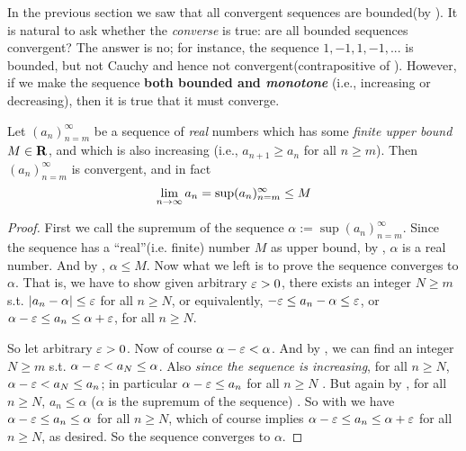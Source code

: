 \begin{note}
In the previous section we saw that all convergent sequences are bounded(by ).
It is natural to ask whether the \emph{converse} is true:
are all bounded sequences convergent?
The answer is no;
for instance, the sequence \(1, -1, 1, -1,...\) is bounded, but not Cauchy and hence not convergent(contrapositive of ).
However, if we make the sequence \textbf{both bounded and \emph{monotone}} (i.e., increasing or decreasing), then it is true that it must converge.
\end{note}

\begin{proposition}  \label{prop 6.3.8}
Let \((a_n)_{n = m}^{\infty}\) be a sequence of \emph{real} numbers which has some \emph{finite upper bound} \(M \in \mathbf{R}\), and which is also increasing (i.e., \(a_{n + 1} \ge a_n\) for all \(n \ge m\)).
Then \((a_n)_{n = m}^{\infty}\) is convergent, and in fact
\[
    \lim_{n \to \infty} a_n = \sup(a_n)_{n = m}^{\infty} \le M
\]
\end{proposition}

\begin{proof}
First we call the supremum of the sequence \(\alpha := \sup(a_n)_{n = m}^{\infty}\).
Since the sequence has a ``real''(i.e. finite) number \(M\) as upper bound, by , \(\alpha\) is a real number.
And by , \(\alpha \le M\).
Now what we left is to prove the sequence converges to \(\alpha\).
That is, we have to show given arbitrary \(\varepsilon > 0\), there exists an integer \(N \ge m\) s.t. \(\lvert a_n - \alpha\rvert \le \varepsilon\) for all \(n \ge N\), or equivalently, \(-\varepsilon \le a_n - \alpha \le \varepsilon\), or \(\alpha - \varepsilon \le a_n \le \alpha + \varepsilon\), for all \(n \ge N\).

So let arbitrary \(\varepsilon > 0\).
Now of course \(\alpha - \varepsilon < \alpha\).
And by , we can find an integer \(N \ge m\) s.t. \(\alpha - \varepsilon < a_N \le \alpha\).
Also \emph{since the sequence is increasing}, for all \(n \ge N\), \(\alpha - \varepsilon < a_N \le a_n\);
in particular \(\alpha - \varepsilon \le a_n\) for all \(n \ge N\) .
But again by , for all \(n \ge N\), \(a_n \le \alpha\) (\(\alpha\) is the supremum of the sequence) .
So with  we have \(\alpha - \varepsilon \le a_n \le \alpha\) for all \(n \ge N\), which of course implies \(\alpha - \varepsilon \le a_n \le \alpha + \varepsilon\) for all \(n \ge N\), as desired.
So the sequence converges to \(\alpha\).
\end{proof}

